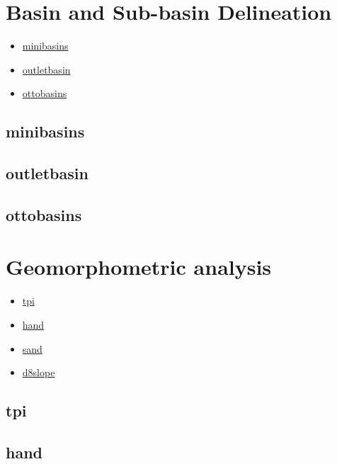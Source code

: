 \documentclass[
]{book}
\providecommand{\tightlist}{%
  \setlength{\itemsep}{0pt}\setlength{\parskip}{0pt}}
\theoremstyle{definition}
\theoremstyle{definition}
\theoremstyle{definition}
\theoremstyle{definition}
\theoremstyle{remark}
\begin{document}
\section{Basin and Sub-basin Delineation}\label{Basin-and-Sub-basin-Delineation}

\begin{itemize}
\tightlist
\item
  \hyperref[minibasins]{minibasins}\\
\item
  \hyperref[outletbasin]{outletbasin}\\
\item
  \hyperref[ottobasins]{ottobasins}
\end{itemize}

\subsection{minibasins}\label{minibasins}

\subsection{outletbasin}\label{outletbasin}

\subsection{ottobasins}\label{ottobasins}

\section{Geomorphometric analysis}\label{Geomorphometric-analysis}

\begin{itemize}
\tightlist
\item
  \hyperref[tpi]{tpi}\\
\item
  \hyperref[hand]{hand}\\
\item
  \hyperref[sand]{sand}\\
\item
  \hyperref[d8slope]{d8slope}
\end{itemize}

\subsection{tpi}\label{tpi}

\subsection{hand}\label{hand}
\end{document}
